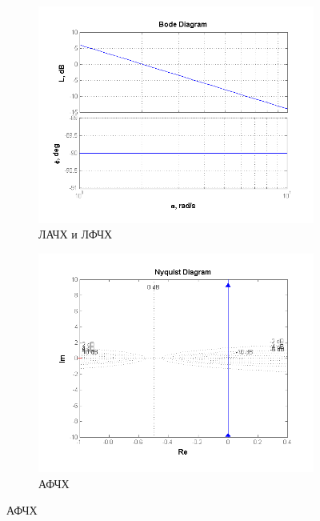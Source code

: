 \documentclass[a4paper, 11pt, russian]{article}
\begin{document}
    \begin{figure}[ht!]
        \centering
        \begin{subfigure}[h]{0.48\textwidth}
            \includegraphics[width = \textwidth]{integratingLinkBode}
            \caption{ЛАЧХ и ЛФЧХ}
        \end{subfigure}
        \hfill
        \begin{subfigure}[h]{0.48\textwidth}
            \includegraphics[width = \textwidth]{integratingLinkNyquist}
            \caption{АФЧХ}
        \end{subfigure}
        

\end{figure}
\end{document}
